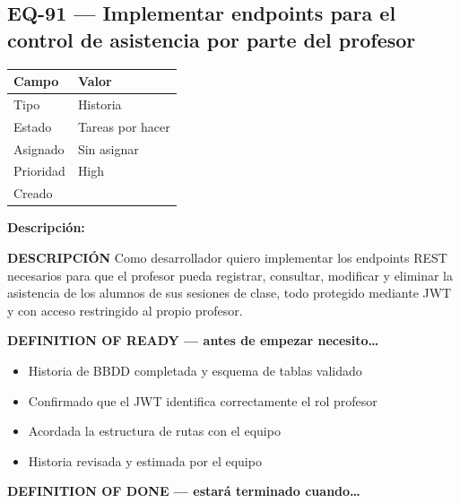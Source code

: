 \documentclass[
  spanish,
  11pt,
]{report}
\newcounter{none} %
\providecommand{\tightlist}{%
  \setlength{\itemsep}{0pt}\setlength{\parskip}{0pt}}
\begin{document}
\subsection{EQ-91 --- Implementar endpoints para el control de
asistencia por parte del
profesor}\label{eq-91-implementar-endpoints-para-el-control-de-asistencia-por-parte-del-profesor}

{\def\LTcaptype{none} %
\begin{longtable}[]{@{}ll@{}}
\toprule\noalign{}
Campo & Valor \\
\midrule\noalign{}
\endhead
\bottomrule\noalign{}
\endlastfoot
Tipo & Historia \\
Estado & Tareas por hacer \\
Asignado & Sin asignar \\
Prioridad & High \\
Creado & \\
\end{longtable}
}

\textbf{Descripción:}

\textbf{DESCRIPCIÓN} Como desarrollador quiero implementar los endpoints
REST necesarios para que el profesor pueda registrar, consultar,
modificar y eliminar la asistencia de los alumnos de sus sesiones de
clase, todo protegido mediante JWT y con acceso restringido al propio
profesor.

\textbf{DEFINITION OF READY --- antes de empezar necesito\ldots{}}

\begin{itemize}
\tightlist
\item
  Historia de BBDD completada y esquema de tablas validado
\item
  Confirmado que el JWT identifica correctamente el rol profesor
\item
  Acordada la estructura de rutas con el equipo
\item
  Historia revisada y estimada por el equipo
\end{itemize}

\textbf{DEFINITION OF DONE --- estará terminado cuando\ldots{}}
\end{document}
